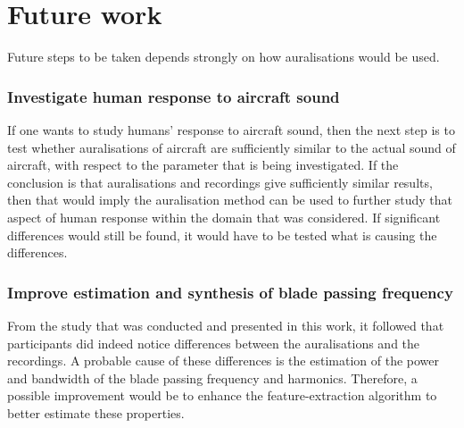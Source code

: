 \newpage
\section{Future work}
Future steps to be taken depends strongly on how auralisations would
be used.

\subsubsection*{Investigate human response to aircraft sound}
If one wants to study humans' response to aircraft sound, then the next step is
to test whether auralisations of aircraft are sufficiently similar to the actual
sound of aircraft, with respect to the parameter that is being investigated. If
the conclusion is that auralisations and recordings give sufficiently similar
results, then that would imply the auralisation method can be used to further
study that aspect of human response within the domain that was considered. If
significant differences would still be found, it would have to be tested what is
causing the differences.


\subsubsection*{Improve estimation and synthesis of blade passing frequency}
From the study that was conducted and presented in this work, it followed that
participants did indeed notice differences between the auralisations and the
recordings. A probable cause of these differences is the estimation of the
power and bandwidth of the blade passing frequency and harmonics. Therefore, a
possible improvement would be to enhance the feature-extraction algorithm to
better estimate these properties.


